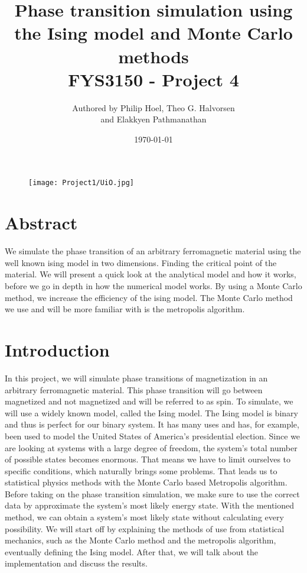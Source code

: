 \documentclass{article}
\title{\textbf{Phase transition simulation using the Ising model and Monte Carlo methods} \\ FYS3150 - Project 4}
\author{Authored by Philip Hoel, Theo G. Halvorsen \\ and Elakkyen Pathmanathan}
\date{\today}
\begin{document}
\maketitle

\begin{figure}
    \texttt{[image: Project1/UiO.jpg]}
\end{figure}

\newpage

\tableofcontents
\newpage

\section{Abstract}
We simulate the phase transition of an arbitrary ferromagnetic material using the well known ising model in two dimensions. Finding the critical point of the material. We will present a quick look at the analytical model and how it works, before we go in depth in how the numerical model works. By using a Monte Carlo method, we increase the efficiency of the ising model. The Monte Carlo method we use and will be more familiar with is the metropolis algorithm.

\section{Introduction}

In this project, we will simulate phase transitions of magnetization in an arbitrary ferromagnetic material. This phase transition will go between magnetized and not magnetized and will be referred to as spin. To simulate, we will use a widely known model, called the Ising model. The Ising model is binary and thus is perfect for our binary system. It has many uses and has, for example, been used to model the United States of America's presidential election. Since we are looking at systems with a large degree of freedom, the system's total number of possible states becomes enormous. That means we have to limit ourselves to specific conditions, which naturally brings some problems. That leads us to statistical physics methods with the Monte Carlo based Metropolis algorithm.  Before taking on the phase transition simulation, we make sure to use the correct data by approximate the system's most likely energy state. With the mentioned method, we can obtain a system's most likely state without calculating every possibility.
\newline
\newline
We will start off by explaining the methods of use from statistical mechanics, such as the Monte Carlo method and the metropolis algorithm, eventually defining the Ising model. After that, we will talk about the implementation and discuss the results.
\end{document}
